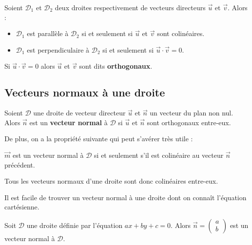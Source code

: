 	\begin{formula}[Propriétés]
		Soient $\mathcal{D}_1$ et $\mathcal{D}_2$ deux droites respectivement de vecteurs directeurs $\overrightarrow{u}$ et $\overrightarrow{v}$. Alors :
		\begin{itemize}
			\item $\mathcal{D}_1$ est parallèle à $\mathcal{D}_2$ si et seulement si $\overrightarrow{u}$ et $\overrightarrow{v}$ sont colinéaires.
			\item $\mathcal{D}_1$ est perpendiculaire à $\mathcal{D}_2$ si et seulement si $\overrightarrow{u} \cdot \overrightarrow{v} = 0$.
		\end{itemize}
	\end{formula}

	\begin{formula}[Orthogonalité]
		Si $\overrightarrow{u} \cdot \overrightarrow{v} = 0$ alors $\overrightarrow{u}$ et $\overrightarrow{v}$ sont dits \textbf{orthogonaux}.
	\end{formula}

	\subsection{Vecteurs normaux à une droite}

	\begin{formula}[Définition]
		Soient $\mathcal{D}$ une droite de vecteur directeur $\overrightarrow{u}$ et $\overrightarrow{n}$ un vecteur du plan non nul. Alors $\overrightarrow{n}$ est un \textbf{vecteur normal} à $\mathcal{D}$ si $\overrightarrow{u}$ et $\overrightarrow{n}$ sont orthogonaux entre-eux.
	\end{formula}


	De plus, on a la propriété suivante qui peut s'avérer très utile :

	\begin{formula}
		$\overrightarrow{m}$ est un vecteur normal à $\mathcal{D}$ si et seulement s'il est colinéaire au vecteur $\overrightarrow{n}$ précédent.
	\end{formula}

	Tous les vecteurs normaux d'une droite sont donc colinéaires entre-eux.

	Il est facile de trouver un vecteur normal à une droite dont on connaît l'équation cartésienne.

	\begin{formula}
		Soit $\mathcal{D}$ une droite définie par l'équation $ax + by + c = 0$. Alors $\overrightarrow{n} = \begin{pmatrix} a \\ b\end{pmatrix}$ est un vecteur normal à $\mathcal{D}$.
	\end{formula}

